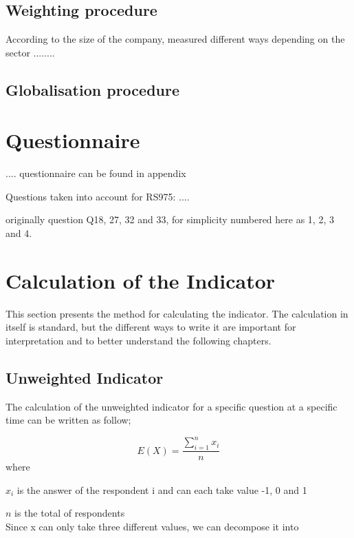 \documentclass[12pt,a4paper,oneside]{book}
\begin{document}
\subsection{Weighting procedure}

According to the size of the company, measured different ways depending on the sector ........

\subsection{Globalisation procedure}



\section{Questionnaire}
.... questionnaire can be found in appendix %


Questions taken into account for RS975:
....

originally question Q18, 27, 32 and 33, for simplicity numbered here as 1, 2, 3 and 4.


\newpage

\section{Calculation of the Indicator}

This section presents the method for calculating the indicator. 
The calculation in itself is standard, but the different ways to write it are important for interpretation and to better understand the following chapters.

\subsection{Unweighted Indicator}

The calculation of the unweighted indicator for a specific question at a specific time can be written as follow;

\begin{equation}
    E(X) = \frac{ \sum_{i=1}^n x_i}{n}
\end{equation} 
where 

$x_i$ is the answer of the respondent i and can each take value -1, 0 and 1 

$n$ is the total of respondents \\

Since x can only take three different values, we can decompose it into 
\end{document}

